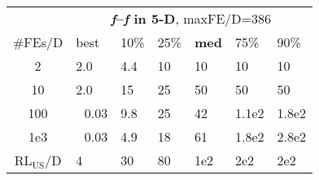 \begin{tabular}{c|llllll}
 & \multicolumn{6}{|c}{\textbf{\textit{f}\raisebox{-0.35ex}{1}--\textit{f}\raisebox{-0.35ex}{24} in 5-D}, maxFE/D=386}\\
\#FEs/D & best & 10\% & 25\% & \textbf{med} & 75\% & 90\%\\
2 & \hspace*{1ex}2.0 & \hspace*{1ex}4.4 & 10 & 10 & 10 & 10\\
10 & \hspace*{1ex}2.0 & 15 & 25 & 50 & 50 & 50\\
100 & ~\,0.03 & \hspace*{1ex}9.8 & 25 & 42 & 1.1e2 & 1.8e2\\
1e3 & ~\,0.03 & \hspace*{1ex}4.9 & 18 & 61 & 1.8e2 & 2.8e2\\
$\text{RL}_{\text{US}}$/D & 4 & 30 & 80 & 1e2 & 2e2 & 2e2
\end{tabular}
